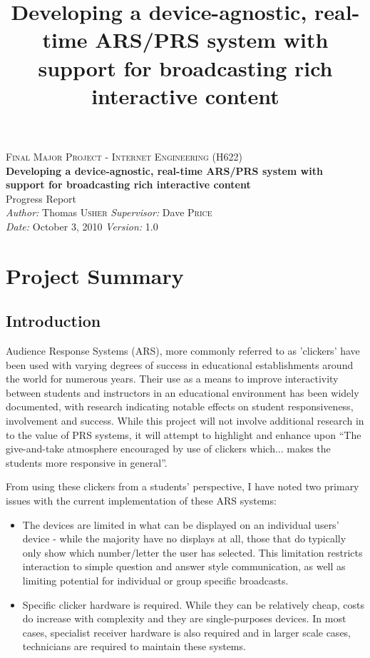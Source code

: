 \documentclass[a4papert,11pt,notitlepage]{ltxdoc}
\title{Developing a device-agnostic, real-time ARS/PRS system with support for
broadcasting rich interactive content}
\begin{document}
\begin{center}
\textsc{\Large Final Major Project - Internet Engineering (H622)}\\[0.3cm]
{\Large \bfseries Developing a device-agnostic, real-time ARS/PRS system with support for
broadcasting rich interactive content}\\[0.3cm]
{\Large Progress Report}\\[0.3cm]
\emph{Author:} Thomas \textsc{Usher} \hspace{1cm} \emph{Supervisor:} Dave \textsc{Price}\\
\emph{Date:} October 3, 2010 \hspace{1cm} \emph{Version:} 1.0
\end{center}
\section{Project Summary}
\subsection{Introduction}
Audience Response Systems (ARS), more commonly referred to as 'clickers' have been used with varying degrees of success in educational establishments around the world for numerous years. Their use as a means to improve interactivity between students and instructors in an educational environment has been widely documented, with research indicating notable effects on student responsiveness, involvement and success. While this project will not involve additional research in to the value of PRS systems, it will attempt to highlight and enhance upon ``The give-and-take atmosphere encouraged by use of clickers which... makes the students more responsive in general''\cite{wood:clickers}.

From using these clickers from a students' perspective, I have noted two primary issues with the current implementation of these ARS systems:
\begin{itemize}
\item The devices are limited in what can be displayed on an individual users' device - while the majority have no displays at all, those that do typically only show which number/letter the user has selected. This limitation restricts interaction to simple question and answer style communication, as well as limiting potential for individual or group specific broadcasts.
\item Specific clicker hardware is required. While they can be relatively cheap, costs do increase with complexity and they are single-purposes devices. In most cases, specialist receiver hardware is also required and in larger scale cases, technicians are required to maintain these systems.
\end{itemize}
\end{document}
